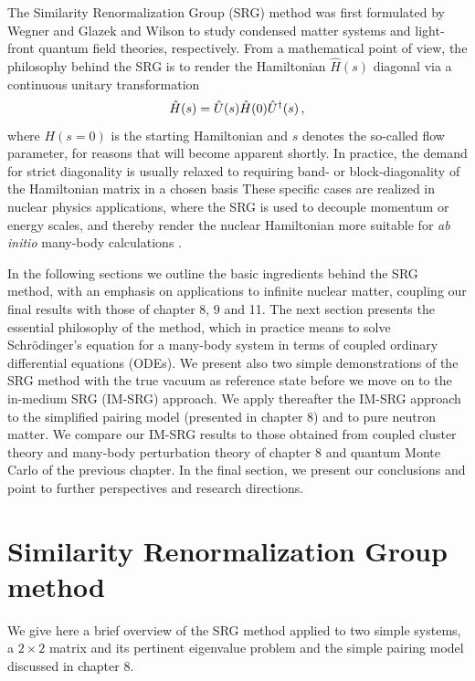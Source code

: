 The Similarity Renormalization Group (SRG) method was first formulated by
Wegner \cite{wegner1994} and Glazek and Wilson \cite{glazek1993}
to study condensed matter systems and light-front quantum field
theories, respectively.  From a mathematical point of view, the
philosophy behind the SRG is to render the Hamiltonian $\hat{H}(s)$
diagonal via a continuous unitary transformation
\begin{equation}\label{eq:cut}
  \hat{H}(s)=\hat{U}(s)\hat{H}(0)\UUO(s)\,,
\end{equation}
where $H(s=0)$ is the starting Hamiltonian and $s$ denotes the so-called flow
parameter, for reasons that will become apparent shortly. In practice, the demand 
for strict diagonality is usually relaxed to requiring band- or block-diagonality 
of the Hamiltonian matrix in a chosen basis
These specific cases are realized in nuclear
physics applications, where the SRG is used to decouple momentum or
energy scales, and thereby render the nuclear Hamiltonian more
suitable for \emph{ab initio} many-body calculations \cite{bogner2007,bogner2010,morris2015,bogner2016}.

In the following sections we outline the basic ingredients behind the
SRG method, with an emphasis on applications to infinite nuclear
matter, coupling our final results with those of chapter 8, 9 and
11. The next section presents the essential philosophy of the method,
which in practice means to solve Schr\"odinger's equation for a
many-body system in terms of coupled ordinary differential equations
(ODEs). We present also two simple demonstrations of the SRG method with the true vacuum as reference state before
we move on to the in-medium SRG (IM-SRG) approach. 
We apply thereafter the IM-SRG approach to the simplified pairing  model (presented in chapter 8) and 
to pure neutron matter. We compare our IM-SRG results to those obtained from coupled cluster theory and many-body perturbation theory of  chapter 8 and quantum Monte Carlo of the previous chapter.  In the final section, we present our conclusions and point  to further
perspectives and research directions.

\section{Similarity Renormalization Group method}

We give here a brief overview of the SRG method applied to two simple systems,  a $2\times 2$ matrix and its pertinent eigenvalue problem and the simple pairing model discussed in chapter 8. 

